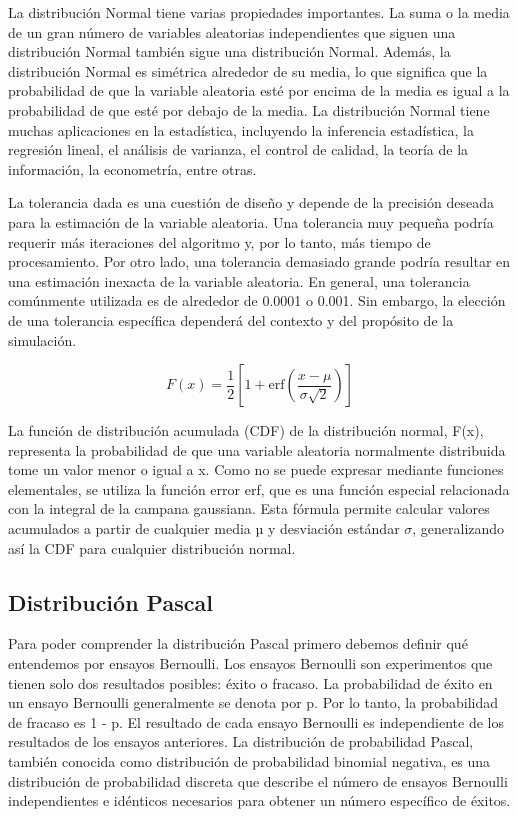 \documentclass{article}
\begin{document}
 La distribución Normal tiene varias propiedades importantes. La suma o la media de un gran número de variables aleatorias independientes que siguen una distribución Normal también sigue una distribución Normal. Además, la distribución Normal es simétrica alrededor de su media, lo que significa que la probabilidad de que la variable aleatoria esté por encima de la media es igual a la probabilidad de que esté por debajo de la media. La distribución Normal tiene muchas aplicaciones en la estadística, incluyendo la inferencia estadística, la regresión lineal, el análisis de varianza, el control de calidad, la teoría de la información, la econometría, entre otras.

 La tolerancia dada es una cuestión de diseño y depende de la precisión deseada para la estimación de la variable aleatoria. Una tolerancia muy pequeña podría requerir más iteraciones del algoritmo y, por lo tanto, más tiempo de procesamiento. Por otro lado, una tolerancia demasiado grande podría resultar en una estimación inexacta de la variable aleatoria. En general, una tolerancia comúnmente utilizada es de alrededor de 0.0001 o 0.001. Sin embargo, la elección de una tolerancia específica dependerá del contexto y del propósito de la simulación.
 
\begin{equation}
    F(x) = \frac{1}{2} \left[ 1 + \mathrm{erf} \left( \frac{x - \mu}{\sigma \sqrt{2}} \right) \right]
\end{equation}


La función de distribución acumulada (CDF) de la distribución normal, F(x), representa la probabilidad de que una variable aleatoria normalmente distribuida tome un valor menor o igual a x. Como no se puede expresar mediante funciones elementales, se utiliza la función error erf, que es una función especial relacionada con la integral de la campana gaussiana. Esta fórmula permite calcular valores acumulados a partir de cualquier media µ y desviación estándar $\sigma$, generalizando así la CDF para cualquier distribución normal.

\subsection{Distribución Pascal}
 Para poder comprender la distribución Pascal primero debemos definir qué entendemos por ensayos Bernoulli. Los ensayos Bernoulli son experimentos que tienen solo dos resultados posibles: éxito o fracaso. La probabilidad de éxito en un ensayo Bernoulli generalmente se denota por p. Por lo tanto, la probabilidad de fracaso es 1 - p. El resultado de cada ensayo Bernoulli es independiente de los resultados de los ensayos anteriores.
 La distribución de probabilidad Pascal, también conocida como distribución de probabilidad binomial negativa, es una distribución de probabilidad discreta que describe el número de ensayos Bernoulli independientes e idénticos necesarios para obtener un número específico de éxitos.
 
\end{document}
